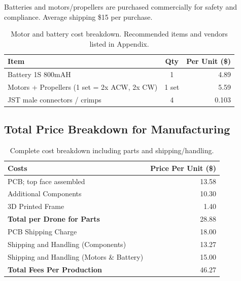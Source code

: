 Batteries and motors/propellers are purchased commercially for safety and compliance. Average shipping \$15 per purchase.

\begin{table}[H]
\centering
\begin{tabular}{l c r}
\toprule
\textbf{Item} & \textbf{Qty} & \textbf{Per Unit (\$)} \\
\midrule
Battery 1S 800mAH & 1 & 4.89 \\
Motors + Propellers (1 set = 2x ACW, 2x CW) & 1 set & 5.59 \\
JST male connectors / crimps & 4 & 0.103 \\
\bottomrule
\end{tabular}
\caption{Motor and battery cost breakdown. Recommended items and vendors listed in Appendix.}
\end{table}

\subsection{Total Price Breakdown for Manufacturing}

\begin{table}[H]
\centering
\begin{tabular}{l r}
\toprule
\textbf{Costs} & \textbf{Price Per Unit (\$)} \\
\midrule
PCB; top face assembled & 13.58 \\
Additional Components & 10.30 \\
3D Printed Frame & 1.40 \\
\midrule
\textbf{Total per Drone for Parts} & 28.88 \\
PCB Shipping Charge & 18.00 \\
Shipping and Handling (Components) & 13.27 \\
Shipping and Handling (Motors \& Battery) & 15.00 \\
\midrule
\textbf{Total Fees Per Production} & 46.27 \\
\bottomrule
\end{tabular}
\caption{Complete cost breakdown including parts and shipping/handling.}
\end{table}
